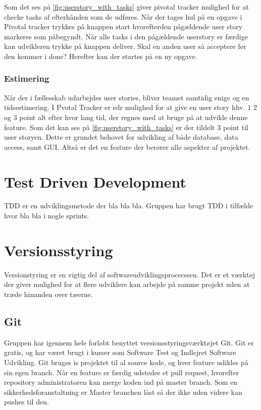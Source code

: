 Som det ses på \ref{fig:userstory_with_tasks} giver pivotal tracker mulighed for at checke tasks af efterhånden som de udføres. Når der tages hul på en opgave i Pivotal tracker trykkes på knappen start hvorefterden pågældende user story markeres som påbegyndt. Når alle tasks i den pågældende userstory er færdige kan udvikleren trykke på knappen deliver. Skal en anden user så acceptere før den kommer i done? Herefter kan der startes på en ny opgave.

\subsubsection{Estimering}
Når der i fællesskab udarbejdes user stories, bliver teamet samtidig enige og en tidsestimering. I Pvotal Tracker er edr mulighed for at give en user story hhv. 1 2 og 3 point alt efter hvor lang tid, der regnes med at bruge på at udvikle denne feature.  Som det kan ses på \ref{fig:userstory_with_tasks} er der tildelt 3 point til user storyen. Dette er grundet behovet for udvikling af både database, data access, samt GUI. Altså er det en feature der berører alle aspekter af projektet.

\section{Test Driven Development}
TDD er en udviklingsmetode der bla bla bla. Gruppen har brugt TDD i tilfælde hvor bla bla i nogle sprints.

\section{Versionsstyring}
Versionstyring er en vigtig del af softwareudviklingsprocecssen. Det er et værktøj der giver mulighed for at flere udviklere kan arbejde på samme projekt uden at træde hinanden over tæerne.

\subsection{Git}
Gruppen har igennem hele forløbt benyttet versionsstyringsværktøjet Git. Git er gratis, og har været brugt i kurser som Software Test og Indlejret Software Udvikling. Git bruges is projektet til al source kode, og hver feature udikles på sin egen branch. Når en feature er færdig udstedes et pull request, hvorefter repository administratoren kan merge koden ind på master branch. Som en sikkerhedsforanstaltning er Master branchen låst så der ikke uden videre kan pushes til den.

